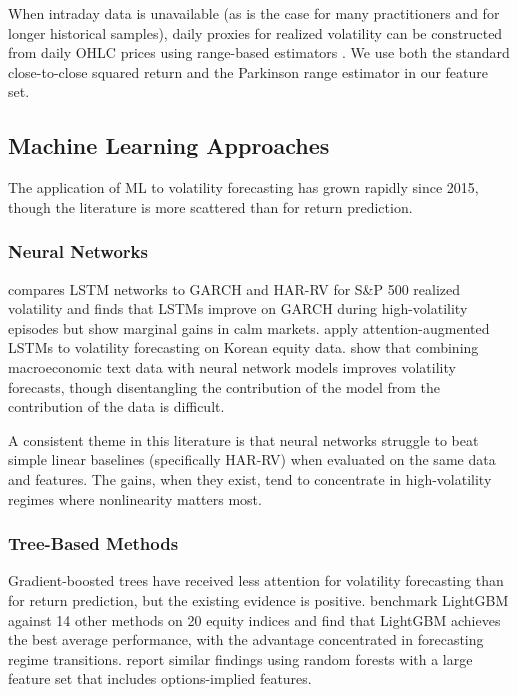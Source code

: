 When intraday data is unavailable (as is the case for many practitioners and for longer historical samples), daily proxies for realized volatility can be constructed from daily OHLC prices using range-based estimators \citep{Parkinson1980, GarmanKlass1980}. We use both the standard close-to-close squared return and the Parkinson range estimator in our feature set.

\subsection{Machine Learning Approaches}

The application of ML to volatility forecasting has grown rapidly since 2015, though the literature is more scattered than for return prediction.

\subsubsection{Neural Networks}

\citet{Bucci2020} compares LSTM networks to GARCH and HAR-RV for S\&P 500 realized volatility and finds that LSTMs improve on GARCH during high-volatility episodes but show marginal gains in calm markets. \citet{Kim2019} apply attention-augmented LSTMs to volatility forecasting on Korean equity data. \citet{Rahimikia2021} show that combining macroeconomic text data with neural network models improves volatility forecasts, though disentangling the contribution of the model from the contribution of the data is difficult.

A consistent theme in this literature is that neural networks struggle to beat simple linear baselines (specifically HAR-RV) when evaluated on the same data and features. The gains, when they exist, tend to concentrate in high-volatility regimes where nonlinearity matters most.

\subsubsection{Tree-Based Methods}

Gradient-boosted trees have received less attention for volatility forecasting than for return prediction, but the existing evidence is positive. \citet{Mittnik2022} benchmark LightGBM against 14 other methods on 20 equity indices and find that LightGBM achieves the best average performance, with the advantage concentrated in forecasting regime transitions. \citet{Luong2021} report similar findings using random forests with a large feature set that includes options-implied features.

